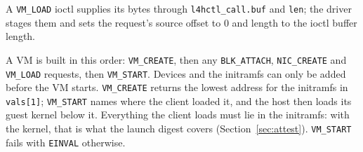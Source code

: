 \documentclass[11pt,a4paper]{report}
\begin{document}
A \texttt{VM\_LOAD} ioctl supplies its bytes through
\texttt{l4hctl\_call.buf} and \texttt{len}; the driver stages them and sets
the request's source offset to 0 and length to the ioctl buffer length.

A VM is built in this order: \texttt{VM\_CREATE}, then any
\texttt{BLK\_ATTACH}, \texttt{NIC\_CREATE} and \texttt{VM\_LOAD} requests,
then \texttt{VM\_START}. Devices and the initramfs can only be added before
the VM starts. \texttt{VM\_CREATE} returns the lowest address for the
initramfs in \texttt{vals[1]}; \texttt{VM\_START} names where the client
loaded it, and the host then loads its guest kernel below it. Everything
the client loads must lie in the initramfs: with the kernel, that is what
the launch digest covers (Section~\ref{sec:attest}). \texttt{VM\_START}
fails with \texttt{EINVAL} otherwise.
\end{document}
